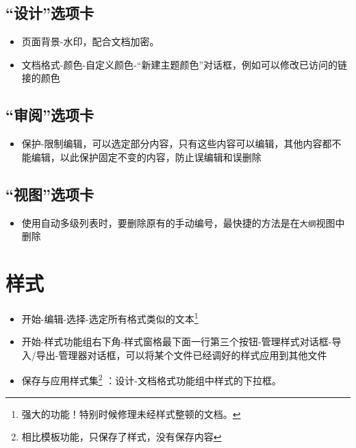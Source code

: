 \documentclass[]{ctexbook}
\providecommand{\tightlist}{%
  \setlength{\itemsep}{0pt}\setlength{\parskip}{0pt}}
\begin{document}
\hypertarget{ux8bbeux8ba1ux9009ux9879ux5361}{%
\section{``设计''选项卡}\label{ux8bbeux8ba1ux9009ux9879ux5361}}

\begin{itemize}
\tightlist
\item
  页面背景-水印，配合文档加密。
\item
  文档格式-颜色-自定义颜色-``新建主题颜色''对话框，例如可以修改已访问的链接的颜色
\end{itemize}

\hypertarget{ux5ba1ux9605ux9009ux9879ux5361}{%
\section{``审阅''选项卡}\label{ux5ba1ux9605ux9009ux9879ux5361}}

\begin{itemize}
\tightlist
\item
  保护-限制编辑，可以选定部分内容，只有这些内容可以编辑，其他内容都不能编辑，以此保护固定不变的内容，防止误编辑和误删除
\end{itemize}

\hypertarget{ux89c6ux56feux9009ux9879ux5361}{%
\section{``视图''选项卡}\label{ux89c6ux56feux9009ux9879ux5361}}

\begin{itemize}
\tightlist
\item
  使用自动多级列表时，要删除原有的手动编号，最快捷的方法是在\texttt{大纲}视图中删除
\end{itemize}

\hypertarget{ux6837ux5f0f}{%
\chapter{样式}\label{ux6837ux5f0f}}

\begin{itemize}
\tightlist
\item
  开始-编辑-选择-选定所有格式类似的文本\footnote{强大的功能！特别时候修理未经样式整顿的文档。}
\item
  开始-样式功能组右下角-样式窗格最下面一行第三个按钮-管理样式对话框-导入/导出-管理器对话框，可以将某个文件已经调好的样式应用到其他文件
\item
  保存与应用样式集\footnote{相比模板功能，只保存了样式，没有保存内容} ：设计-文档格式功能组中样式的下拉框。
\end{itemize}
\end{document}
